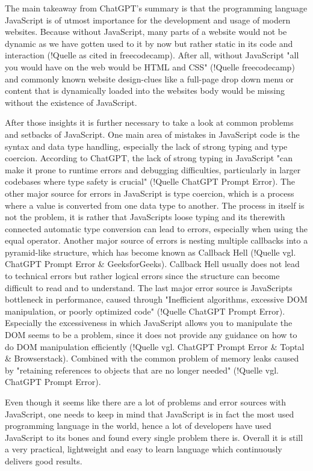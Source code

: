 The main takeaway from ChatGPT's summary is that the programming language JavaScript is of utmost importance for the development and usage of modern websites. Because without JavaScript, many parts of a website would not be dynamic as we have gotten used to it by now but rather static in its code and interaction (!Quelle as cited in freecodecamp). After all, without JavaScript "all you would have on the web would be HTML and CSS" (!Quelle freecodecamp) and commonly known website design-clues like a full-page drop down menu or content that is dynamically loaded into the websites body would be missing without the existence of JavaScript.

After those insights it is further necessary to take a look at common problems and setbacks of JavaScript. One main area of mistakes in JavaScript code is the syntax and data type handling, especially the lack of strong typing and type coercion. According to ChatGPT, the lack of strong typing in JavaScript "can make it prone to runtime errors and debugging difficulties, particularly in larger codebases where type safety is crucial" (!Quelle ChatGPT Prompt Error). The other major source for errors in JavaScript is type coercion, which is a process where a value is converted from one data type to another. The process in itself is not the problem, it is rather that JavaScripts loose typing and its therewith connected automatic type conversion can lead to errors, especially when using the equal operator.
Another major source of errors is nesting multiple callbacks into a pyramid-like structure, which has become known as Callback Hell (!Quelle vgl. ChatGPT Prompt Error \& GeeksforGeeks). Callback Hell usually does not lead to technical errors but rather logical errors since the structure can become difficult to read and to understand. 
The last major error source is JavaScripts bottleneck in performance, caused through "Inefficient algorithms, excessive DOM manipulation, or poorly optimized code" (!Quelle ChatGPT Prompt Error). Especially the excessiveness in which JavaScript allows you to manipulate the DOM seems to be a problem, since it does not provide any guidance on how to do DOM manipulation efficiently (!Quelle vgl. ChatGPT Prompt Error \& Toptal \& Browserstack). Combined with the common problem of memory leaks caused by "retaining references to objects that are no longer needed" (!Quelle vgl. ChatGPT Prompt Error).

Even though it seems like there are a lot of problems and error sources with JavaScript, one needs to keep in mind that JavaScript is in fact the most used programming language in the world, hence a lot of developers have used JavaScript to its bones and found every single problem there is. Overall it is still a very practical, lightweight and easy to learn language which continuously delivers good results.